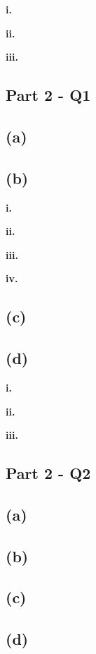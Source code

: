 \documentclass[12pt,a4paper,oneside]{report}
\begin{document}
\textbf{i. }

\textbf{ii. }

\textbf{iii. }

\subsection*{Part 2 - Q1}

\subsection*{(a)}

\subsection*{(b)}

\textbf{i. }

\textbf{ii. }

\textbf{iii. }

\textbf{iv. }

\subsection*{(c)}

\subsection*{(d)}

\textbf{i. }

\textbf{ii. }

\textbf{iii. }

\subsection*{Part 2 - Q2}

\subsection*{(a)}

\subsection*{(b)}

\subsection*{(c)}

\subsection*{(d)}
\end{document}
